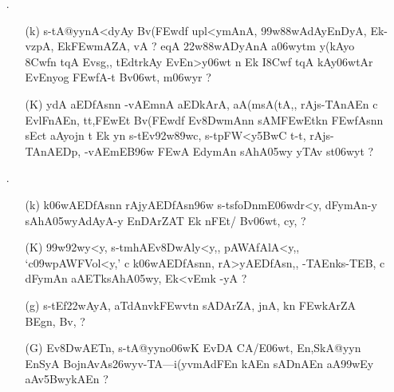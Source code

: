 \def\DevnagVersion{2.15}\documentclass{article}
\begin{document}
\begin{itemize}
  \item[{\dn \dnnum \rn{31}}.] \begin{itemize}
                 
                 \item[({\dn k})] {\dn s\2-tA@yynA<dyAy Bv(\3FEwd\?f\? upl<ymAnA, \399w\388wAdAyEnDyA, Ek\2-vzpA, Ek\2\3FEwmAZA, vA {\rs ?\re} eqA\2 \322w\388wADyAnA a\306wytm\?{\rs ,\re} y(kAyo{\qvb} \38Cw\?f\?n t\?qA\2 Evsg\0,{\rs ,\re} tEdtrkAy\?{\qvb} EvEn>y\306wt\? n Ek I\38Cwf\2 t\?qA\2 kAy\0\306wtAr\? EvEnyog\2 \3FEwfA-t\2 Bv\306wt, m\306wy\?r {\rs ?\re}}
                 
                 \item[({\dn K})] {\dn ydA aEDfAsn\?n -vAEmnA aEDkArA, aA(msA(tA,{\rs ,\re} rAjs\2-TAnAEn c EvlFnAEn{\rs ,\re} tt,\3FEwEt Bv(\3FEwd\?f\? Ev\38DwmAn\?n sAM\3FEwEtk\?n \3FEwfAsn\?n sEct aAyojn\2 t\2 Ek y\?n s\2-tEv\392w\389wc, s\2-tpFW\?<y\35BwC t\4-t\4, rAjs\2-TAnAEDp\4, -vAEmEB\396w \3FEwA EdymAn\2 sAhA\305wy\2 yTAv\0 s\2t\306wy\?t {\rs ?\re}}
  
                \end{itemize} 
                
\item[{\dn \dnnum \rn{32}}.] \begin{itemize}
               
               \item[({\dn k})] {\dn k\?\306wAEDfAsn\?n rAjyAEDfAsn\4\396w s\2-ts\2foDnmE\306wdr\?<y, dFymAn-y sAhA\305wyAdAyA-y EnDA\0rZAT\0 Ek\2 nFEt/\2 Bv\306wt, cy\?, {\rs ?\re}}  
                
               \item[({\dn K})] {\dn \399w\392w\?y\?<y, s\2-tmhAEv\38DwAly\?<y,{\rs ,\re} pAWAfAlA<y,{\rs ,\re} {\rs `\re}c\309wpAWFVol\?<y,{\rs '\re} c k\?\306wAEDfAsn\?n{\rs ,\re} rA>yAEDfAsn\4,{\rs ,\re} -TAEnks\2-TEB, c dFymAn aAET\0ksAhA\305wy, Ek\2<vEmk\2 -yA {\rs ?\re} } 
               
               \item[({\dn g})] {\dn s\2-tEf\322wAyA, aT\0dAnv\0k\3FEwvt\0n\? sADArZA, jnA, k\?n \3FEwkAr\?ZA BEgn, Bv\?, {\rs ?\re}}
               
               \item[({\dn G})] {\dn Ev\38DwAET\0n, s\2-tA@yyno\306wK EvDA\2 CA/E\306wt{\rs ,\re} En,SkA@yyn En\0SyA BojnAvAs\326wyv-TA{\rs ---\re}i(y\?vmAdFEn kAEn sADnAEn aA\399wEy aAv\35BwykAEn {\rs ?\re}}
               

\end{itemize}
\end{itemize}
\end{document}
